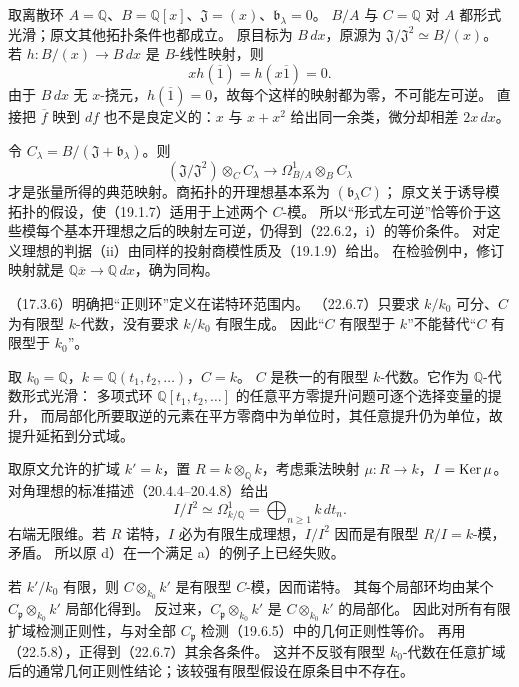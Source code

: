 取离散环 $A=\mathbb Q$、$B=\mathbb Q[x]$、$\mathfrak J=(x)$、$\mathfrak b_\lambda=0$。
$B/A$ 与 $C=\mathbb Q$ 对 $A$ 都形式光滑；原文其他拓扑条件也都成立。
原目标为 $B\,dx$，原源为 $\mathfrak J/\mathfrak J^2\simeq B/(x)$。
若 $h:B/(x)\to B\,dx$ 是 $B$-线性映射，则
\[
 xh(\overline1)=h(x\overline1)=0.
\]
由于 $B\,dx$ 无 $x$-挠元，$h(\overline1)=0$，故每个这样的映射都为零，不可能左可逆。
直接把 $\overline f$ 映到 $df$ 也不是良定义的：$x$ 与 $x+x^2$ 给出同一余类，微分却相差 $2x\,dx$。

令 $C_\lambda=B/(\mathfrak J+\mathfrak b_\lambda)$。则
\[
 (\mathfrak J/\mathfrak J^2)\otimes_CC_\lambda
 \longrightarrow\Omega^1_{B/A}\otimes_BC_\lambda
\]
才是张量所得的典范映射。商拓扑的开理想基本系为 $(\mathfrak b_\lambda C)$；
原文关于诱导模拓扑的假设，使（19.1.7）适用于上述两个 $C$-模。
所以“形式左可逆”恰等价于这些模每个基本开理想之后的映射左可逆，仍得到（22.6.2，i）的等价条件。
对定义理想的判据（ii）由同样的投射商模性质及（19.1.9）给出。
在检验例中，修订映射就是 $\mathbb Q\overline x\to\mathbb Q\,dx$，确为同构。

（17.3.6）明确把“正则环”定义在诺特环范围内。
（22.6.7）只要求 $k/k_0$ 可分、$C$ 为有限型 $k$-代数，没有要求 $k/k_0$ 有限生成。
因此“$C$ 有限型于 $k$”不能替代“$C$ 有限型于 $k_0$”。

取 $k_0=\mathbb Q$，$k=\mathbb Q(t_1,t_2,\ldots)$，$C=k$。
$C$ 是秩一的有限型 $k$-代数。它作为 $\mathbb Q$-代数形式光滑：
多项式环 $\mathbb Q[t_1,t_2,\ldots]$ 的任意平方零提升问题可逐个选择变量的提升，
而局部化所要取逆的元素在平方零商中为单位时，其任意提升仍为单位，故提升延拓到分式域。

取原文允许的扩域 $k'=k$，置 $R=k\otimes_{\mathbb Q}k$，考虑乘法映射 $\mu:R\to k$，$I=\operatorname{Ker}\mu$。
对角理想的标准描述（20.4.4--20.4.8）给出
\[
 I/I^2\simeq\Omega^1_{k/\mathbb Q}
 =\bigoplus_{n\ge1}k\,dt_n.
\]
右端无限维。若 $R$ 诺特，$I$ 必为有限生成理想，$I/I^2$ 因而是有限型 $R/I=k$-模，矛盾。
所以原 d）在一个满足 a）的例子上已经失败。

若 $k'/k_0$ 有限，则 $C\otimes_{k_0}k'$ 是有限型 $C$-模，因而诺特。
其每个局部环均由某个 $C_{\mathfrak p}\otimes_{k_0}k'$ 局部化得到。
反过来，$C_{\mathfrak p}\otimes_{k_0}k'$ 是 $C\otimes_{k_0}k'$ 的局部化。
因此对所有有限扩域检测正则性，与对全部 $C_{\mathfrak p}$ 检测（19.6.5）中的几何正则性等价。
再用（22.5.8），正得到（22.6.7）其余各条件。
这并不反驳有限型 $k_0$-代数在任意扩域后的通常几何正则性结论；该较强有限型假设在原条目中不存在。

